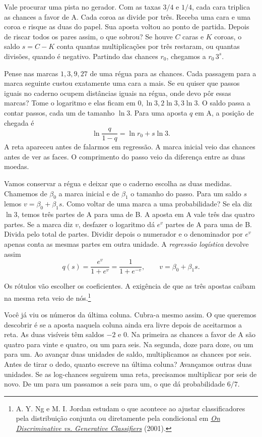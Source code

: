Vale procurar uma pista no gerador. Com as taxas $3/4$ e $1/4$, cada cara triplica as chances a favor de A. Cada coroa as divide por três. Receba uma cara e uma coroa e risque as duas do papel. Sua aposta voltou ao ponto de partida. Depois de riscar todos os pares assim, o que sobrou? Se houve $C$ caras e $K$ coroas, o saldo $s=C-K$ conta quantas multiplicações por três restaram, ou quantas divisões, quando é negativo. Partindo das chances $r_0$, chegamos a $r_0\,3^s$.

Pense nas marcas $1,3,9,27$ de uma régua para as chances. Cada passagem para a marca seguinte custou exatamente uma cara a mais. Se eu quiser que passos iguais no caderno ocupem distâncias iguais na régua, onde devo pôr essas marcas? Tome o logaritmo e elas ficam em $0,\ln 3,2\ln 3,3\ln 3$. O saldo passa a contar passos, cada um de tamanho $\ln 3$. Para uma aposta $q$ em A, a posição de chegada é
\[
             \ln\frac{q}{1-q}=\ln r_0+s\ln 3 .
\]
A reta apareceu antes de falarmos em regressão. A marca inicial veio das chances antes de ver as faces. O comprimento do passo veio da diferença entre as duas moedas.

Vamos conservar a régua e deixar que o caderno escolha as duas medidas. Chamemos de $\beta_0$ a marca inicial e de $\beta_1$ o tamanho do passo. Para um saldo $s$ lemos $v=\beta_0+\beta_1s$. Como voltar de uma marca a uma probabilidade? Se ela diz $\ln 3$, temos três partes de A para uma de B. A aposta em A vale três das quatro partes. Se a marca diz $v$, desfazer o logaritmo dá $e^v$ partes de A para uma de B. Divida pelo total de partes. Dividir depois o numerador e o denominador por $e^v$ apenas conta as mesmas partes em outra unidade. A \emph{regressão logística} devolve assim
\[
              q(s)=\frac{e^v}{1+e^v}=\frac{1}{1+e^{-v}},
              \qquad v=\beta_0+\beta_1s .
\]

Os rótulos vão escolher os coeficientes. A exigência de que as três apostas caibam na mesma reta veio de nós.\footnote{A. Y. Ng e M. I. Jordan estudam o que acontece ao ajustar classificadores pela distribuição conjunta ou diretamente pela condicional em \href{https://proceedings.neurips.cc/paper_files/paper/2001/file/7b7a53e239400a13bd6be6c91c4f6c4e-Paper.pdf}{\emph{On Discriminative vs. Generative Classifiers}} (2001).}

Você já viu os números da última coluna. Cubra-a mesmo assim. O que queremos descobrir é se a aposta naquela coluna ainda era livre depois de aceitarmos a reta. As duas visíveis têm saldos $-2$ e $0$. Na primeira as chances a favor de A são quatro para vinte e quatro, ou um para seis. Na segunda, doze para doze, ou um para um. Ao avançar duas unidades de saldo, multiplicamos as chances por seis. Antes de tirar o dedo, quanto escreve na última coluna? Avançamos outras duas unidades. Se as log-chances seguirem uma reta, precisamos multiplicar por seis de novo. De um para um passamos a seis para um, o que dá probabilidade $6/7$.

